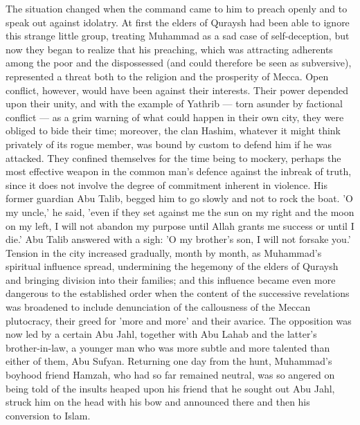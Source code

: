 \documentclass[11pt, b5paper, twoside]{book}
\begin{document}
The situation changed when the command came to him to preach openly and to speak out against 
idolatry. At first the elders of Quraysh had been able to ignore this strange little group, treating 
Muhammad as a sad case of self-deception, but now they began to realize that his preaching, which was 
attracting adherents among the poor and the dispossessed (and could therefore be seen as subversive), 
represented a threat both to the religion and the prosperity of Mecca. Open conflict, however, would 
have been against their interests. Their power depended upon their unity, and with the example of 
Yathrib --- torn asunder by factional conflict --- as a grim warning of what could happen in their own 
city, they were obliged to bide their time; moreover, the clan Hashim, whatever it might think 
privately of its rogue member, was bound by custom to defend him if he was attacked. They confined 
themselves for the time being to mockery, perhaps the most effective weapon in the common man's 
defence against the inbreak of truth, since it does not involve the degree of commitment inherent in 
violence. His former guardian Abu Talib, begged him to go slowly and not to rock the boat. 'O my 
uncle,' he said, 'even if they set against me the sun on my right and the moon on my left, I will not 
abandon my purpose until Allah grants me success or until I die.' Abu Talib answered with a sigh: 'O 
my brother's son, I will not forsake you.' \\

Tension in the city increased gradually, month by month, as Muhammad's spiritual influence spread, 
undermining the hegemony of the elders of Quraysh and bringing division into their families; and this 
influence became even more dangerous to the established order when the content of the successive 
revelations was broadened to include denunciation of the callousness of the Meccan plutocracy, their 
greed for 'more and more' and their avarice. The opposition was now led by a certain Abu Jahl, 
together with Abu Lahab and the latter's brother-in-law, a younger man who was more subtle and more 
talented than either of them, Abu Sufyan. Returning one day from the hunt, Muhammad's boyhood friend 
Hamzah, who had so far remained neutral, was so angered on being told of the insults heaped upon his 
friend that he sought out Abu Jahl, struck him on the head with his bow and announced there and then 
his conversion to Islam. \\
\end{document}
